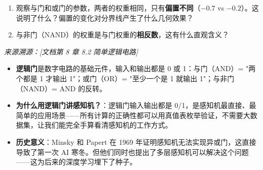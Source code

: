 \documentclass[a4paper,11pt]{ctexart}
\begin{document}
\begin{problembox}
\begin{enumerate}[(1)]
        \item 观察与门和或门的参数，两者的权重相同，只有\textbf{偏置不同}（$-0.7$ vs $-0.2$）。这说明了什么？偏置的变化对分界线产生了什么几何效果？

        \item 与非门（NAND）的权重是与门权重的\textbf{相反数}，这有什么直观含义？
    \end{enumerate}

    \vspace{0.2cm}
    {\color{gray}\small\textit{来源溯源：[文档第 8 章 8.2 简单逻辑电路]}}
\end{problembox}

\begin{beginnerbox}
    \begin{itemize}
        \item \textbf{逻辑门}是数字电路的基础元件，输入和输出都是 0 或 1：与门（AND）= "两个都是 1 才输出 1"；或门（OR）= "至少一个是 1 就输出 1"；与非门（NAND）= AND 的反转。
        \item \textbf{为什么用逻辑门讲感知机？}：逻辑门输入输出都是 0/1，是感知机最直接、最简单的应用场景——所有计算的正确性都可以用真值表枚举验证，不需要大数据集，让我们能完全手算看清感知机的工作方式。
        \item \textbf{历史意义}：Minsky 和 Papert 在 1969 年证明感知机无法实现异或门，这直接导致了第一次 AI 寒冬。但他们同时也提出了多层感知机可以解决这个问题——这为后来的深度学习埋下了种子。
    \end{itemize}
\end{beginnerbox}
\end{document}
